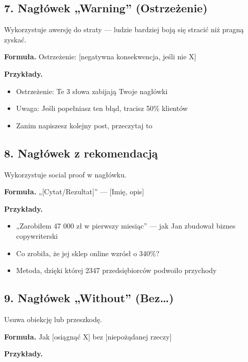 \documentclass[
  12pt,
  a4paper,
  twoside,
  openright,
  12pt,
  DIV=12,
  BCOR=12mm]{scrbook}
\providecommand{\tightlist}{%
  \setlength{\itemsep}{0pt}\setlength{\parskip}{0pt}}\usepackage{longtable,booktabs,array}
\begin{document}
\subsection{7. Nagłówek „Warning''
(Ostrzeżenie)}\label{nagux142uxf3wek-warning-ostrzeux17cenie}

Wykorzystuje awersję do straty --- ludzie bardziej boją się stracić niż
pragną zyskać.

\textbf{Formuła.} Ostrzeżenie: {[}negatywna konsekwencja, jeśli nie X{]}

\textbf{Przykłady.}

\begin{itemize}
\tightlist
\item
  Ostrzeżenie: Te 3 słowa zabijają Twoje nagłówki
\item
  Uwaga: Jeśli popełniasz ten błąd, tracisz 50\% klientów
\item
  Zanim napiszesz kolejny post, przeczytaj to
\end{itemize}

\subsection{8. Nagłówek z
rekomendacją}\label{nagux142uxf3wek-z-rekomendacjux105}

Wykorzystuje social proof w nagłówku.

\textbf{Formuła.} „{[}Cytat/Rezultat{]}'' --- {[}Imię, opis{]}

\textbf{Przykłady.}

\begin{itemize}
\tightlist
\item
  „Zarobiłem 47 000 zł w pierwszy miesiąc'' --- jak Jan zbudował biznes
  copywriterski
\item
  Co zrobiła, że jej sklep online wzrósł o 340\%?
\item
  Metoda, dzięki której 2347 przedsiębiorców podwoiło przychody
\end{itemize}

\subsection{9. Nagłówek „Without''
(Bez\ldots)}\label{nagux142uxf3wek-without-bez}

Usuwa obiekcję lub przeszkodę.

\textbf{Formuła.} Jak {[}osiągnąć X{]} bez {[}niepożądanej rzeczy{]}

\textbf{Przykłady.}
\end{document}
